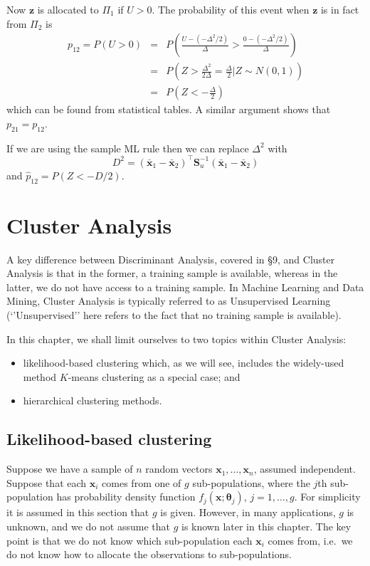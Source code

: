\documentclass[]{book}
\providecommand{\tightlist}{%
  \setlength{\itemsep}{0pt}\setlength{\parskip}{0pt}}
\theoremstyle{definition}
\theoremstyle{definition}
\theoremstyle{definition}
\theoremstyle{remark}
\begin{document}
Now \(\boldsymbol z\) is allocated to \(\Pi_1\) if \(U>0\). The probability of this event when \(\boldsymbol z\) is in fact from \(\Pi_2\) is
\begin{eqnarray*}
p_{12} = P(U>0) &=& P \left(\frac{ U - (-\Delta^2/2) }{\Delta} > \frac{0 - (-\Delta^2/2) }{\Delta} \right)\\
&=& P \left(Z > \frac{\Delta^2}{2\Delta} = \frac{\Delta}{2}  \bigg| Z \sim N(0,1) \right)\\
&=& P \left(Z < -\frac{\Delta}{2} \right)
\end{eqnarray*}
which can be found from statistical tables. A similar argument shows that \(p_{21}=p_{12}\).

If we are using the sample ML rule then we can replace \(\Delta^2\) with
\[D^2 = (\bar{\boldsymbol x}_1 - \bar{\boldsymbol x}_2)^\top \boldsymbol S_u^{-1} (\bar{\boldsymbol x}_1 - \bar{\boldsymbol x}_2)\]
and \(\hat{p}_{12} = P(Z<-D/2)\).

\hypertarget{cluster}{%
\chapter{Cluster Analysis}\label{cluster}}

A key difference between Discriminant Analysis, covered in \S 9, and Cluster Analysis is that in the former, a training sample is available, whereas in the latter, we do not have access to a training sample. In Machine Learning and Data Mining, Cluster Analysis is typically referred to as Unsupervised Learning (`'Unsupervised'' here refers to the fact that no training sample is available).

In this chapter, we shall limit ourselves to two topics within Cluster Analysis:

\begin{itemize}
\tightlist
\item
  likelihood-based clustering which, as we will see, includes the widely-used method \(K\)-means clustering as a special case; and
\item
  hierarchical clustering methods.
\end{itemize}

\hypertarget{likelihood-based-clustering}{%
\section{Likelihood-based clustering}\label{likelihood-based-clustering}}

Suppose we have a sample of \(n\) random vectors \(\boldsymbol x_1, \ldots , \boldsymbol x_n\), assumed independent. Suppose that each \(\boldsymbol x_i\) comes from one of \(g\) sub-populations, where the \(j\)th sub-population has
probability density function \(f_j(\boldsymbol x; \boldsymbol \theta_j)\), \(j=1,\ldots , g\). For simplicity it is assumed in this section that \(g\) is given. However, in many applications, \(g\) is unknown, and we do not assume that \(g\) is known later in this chapter. The key point is that we do not know which sub-population each \(\boldsymbol x_i\) comes from, i.e.~we do not know how to allocate the observations to sub-populations.
\end{document}
